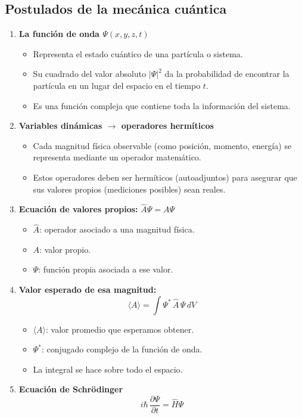 \documentclass[11pt,a4paper]{article}
\begin{document}
\subsection{Postulados de la mecánica cuántica}
\begin{enumerate}
  \item \textbf{La función de onda $\Psi(x,y,z,t)$}
  \begin{itemize}
    \item Representa el estado cuántico de una partícula o sistema.
    \item Su cuadrado del valor absoluto $|\Psi|^2$ da la probabilidad de encontrar la partícula en un lugar del espacio en el tiempo $t$.
    \item Es una función compleja que contiene toda la información del sistema.
  \end{itemize}
  \item \textbf{Variables dinámicas $\rightarrow$ operadores hermíticos}
  \begin{itemize}
    \item Cada magnitud física observable (como posición, momento, energía) se representa mediante un operador matemático.
    \item Estos operadores deben ser hermíticos (autoadjuntos) para asegurar que sus valores propios (mediciones posibles) sean reales.
  \end{itemize}
  \item \textbf{Ecuación de valores propios:} $\hat A\Psi=A\Psi$
  \begin{itemize}
    \item $\hat A$: operador asociado a una magnitud física.
    \item $A$: valor propio.
    \item $\Psi$: función propia asociada a ese valor.
  \end{itemize}
  \item \textbf{Valor esperado de esa magnitud:}
  \[
  \langle A\rangle=\int\Psi^*\,\hat A\,\Psi\,dV
  \]
  \begin{itemize}
    \item $\langle A\rangle$: valor promedio que esperamos obtener.
    \item $\Psi^*$: conjugado complejo de la función de onda.
    \item La integral se hace sobre todo el espacio.
  \end{itemize}
  \item \textbf{Ecuación de Schrödinger}
  \[
  i\hbar\,\frac{\partial\Psi}{\partial t}=\hat H\Psi
\]
\end{enumerate}
\end{document}
